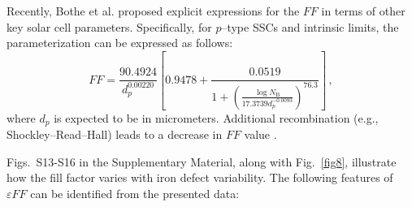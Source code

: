 \documentclass[a4paper,fleqn]{cas-sc}
\begin{document}
Recently, Bothe et al. \cite{Bothe2023} proposed explicit expressions for the $F\!F$ in terms of other key solar cell parameters.
Specifically, for $p$--type SSCs and intrinsic limits, the parameterization can be expressed as follows:
\begin{equation}
\label{eqFF3}
    F\!F = \frac{90.4924}{d_p^{0.00220}}\left[0.9478+\frac{0.0519}{1+\left(\frac{\log N_\mathrm{B}}{17.3739 d_p^{-0.0093}}\right)^{76.3}}\right] \,,
\end{equation}
where
$d_p$ is expected to be in micrometers.
Additional recombination (e.g., Shockley–Read–Hall) leads to a decrease in $F\!F$ value \cite{Bothe2023}.

Figs.~S13-S16 in the Supplementary Material, along with Fig.~\ref{fig8}, illustrate how the fill factor varies with iron defect variability.
The following features of $\varepsilon F\!F$ can be identified from the presented data:
\end{document}
